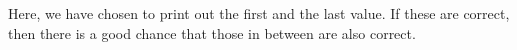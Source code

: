 \inputminted{csharp}{\context/answer/MultiplicationTable.cs}

Here, we have chosen to print out the first and the last value. If these are correct, then there is a good chance that those in between are also correct.
